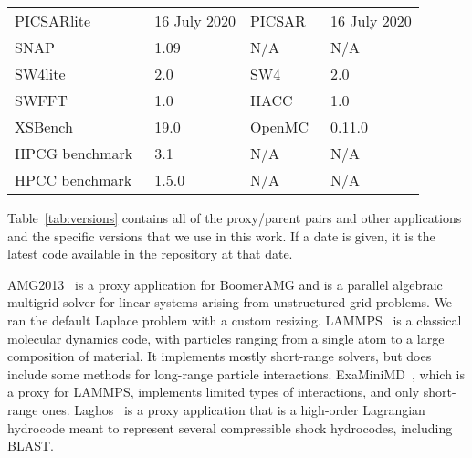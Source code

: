 \begin{table}[!t]
\begin{tabular}{ll|ll}
PICSARlite~\cite{picsarlite}             &\cellcolor{Gray!50}16 July 2020  & PICSAR~\cite{PICSAR}         & \cellcolor{Gray!50}16 July 2020    \\
SNAP~\cite{snap}                            & \cellcolor{Gray!50}1.09              & N/A                                          & \cellcolor{Gray!50}N/A                  \\
SW4lite~\cite{ECPProxySuite1}        & \cellcolor{Gray!50}2.0                & SW4~\cite{SW42}                  & \cellcolor{Gray!50}2.0                    \\
SWFFT~\cite{ECPProxySuite1}  & \cellcolor{Gray!50}1.0                & HACC~\cite{HACC}                & \cellcolor{Gray!50} 1.0                 \\
XSBench~\cite{XSBench}               & \cellcolor{Gray!50}19.0               & OpenMC~\cite{OpenMC}       & \cellcolor{Gray!50}0.11.0             \\
HPCG benchmark~\cite{hpcg}        &  \cellcolor{Gray!50}3.1                & N/A                                         &  \cellcolor{Gray!50}N/A                \\
HPCC benchmark~\cite{hpcc}        &  \cellcolor{Gray!50}1.5.0             & N/A                                          &  \cellcolor{Gray!50}N/A               \\
\bottomrule
\end{tabular}
\end{table}
%
Table~\ref{tab:versions} contains all of the proxy/parent pairs and other
applications and the specific versions that we use in this work. If a
date is given, it is the latest code available in the repository at
that date.

AMG2013~\cite{AMG} is a proxy application for BoomerAMG and is a parallel
algebraic multigrid solver for linear systems arising from unstructured grid
problems.  %
We ran the default Laplace problem with a custom resizing.
%
%
LAMMPS~\cite{LAMMPS} is a classical molecular dynamics code, 
with particles ranging from a single atom to a large composition of material.  
It implements mostly short-range solvers, but does include some methods for long-range particle interactions.  
ExaMiniMD~\cite{ostiExaMiniMD}, which is  
a proxy for LAMMPS, %
implements limited types of interactions, and only short-range ones.
%
Laghos~\cite{Laghos} is a proxy application that is a high-order Lagrangian
hydrocode meant to represent several compressible shock hydrocodes, including BLAST.

